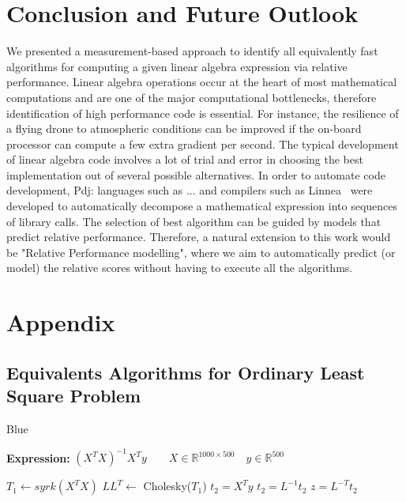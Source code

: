 \documentclass[conference]{IEEEtran}
\newcommand{\p}[1]{{\color{blue} Pdj: #1}}
\begin{document}
\section{Conclusion and Future Outlook}
\label{sec:con}
We presented a measurement-based approach to identify all equivalently fast algorithms for computing a given linear
algebra expression via relative performance. Linear algebra operations occur at the heart of most mathematical
computations and are one of the major computational bottlenecks, therefore identification of high performance code is essential. For instance, the resilience of a flying drone to atmospheric conditions can be improved if the on-board processor can compute a few extra gradient per second. 
The typical development of linear algebra code involves a lot of trial and error in choosing the best implementation out
of several possible alternatives. In order to automate code development, \p{languages such as ...} and compilers such as
Linnea~\cite{barthels2019linnea} were developed to automatically decompose a mathematical expression into sequences of
library calls. 
The selection of best algorithm can be guided by models that predict relative performance. Therefore, a natural extension to this work would be "Relative Performance modelling", where we aim to automatically predict (or model) the relative scores without having to execute all the algorithms.




\clearpage
\section*{Appendix}
\subsection{Equivalents Algorithms for Ordinary Least Square Problem}
\label{sec:appA}
\begin{algorithm}
	\renewcommand{\thealgorithm}{}
	\caption{ Blue }
	\label{alg:a0}
	\textbf{Expression: } $(X^TX)^{-1}X^{T}y \qquad X \in \mathbb{R}^{1000 \times 500} \quad y \in \mathbb{R}^{500}$ 
	\begin{algorithmic}[1] 
		\State $T_1 \leftarrow syrk(X^{T}X)$ 
		\State $LL^{T} \leftarrow $ Cholesky($T_1$) 
		\State $t_2 = X^{T}y$ 
		\State $t_2 = L^{-1}t_2$ 
		\State $z = L^{-T}t_2$
	\end{algorithmic}
\end{algorithm}
\end{document}
